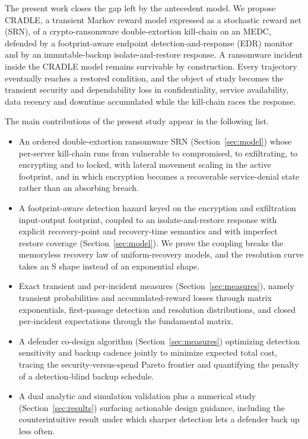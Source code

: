 \documentclass[journal]{IEEEtran}
\begin{document}
The present work closes the gap left by the antecedent model. We propose CRADLE,
a transient Markov reward model expressed as a stochastic reward net (SRN), of a
crypto-ransomware double-extortion kill-chain on an MEDC, defended by a
footprint-aware endpoint detection-and-response (EDR) monitor and by an
immutable-backup isolate-and-restore response. A ransomware incident inside the
CRADLE model remains survivable by construction. Every trajectory eventually
reaches a restored condition, and the object of study becomes the transient
security and dependability loss in confidentiality, service availability, data
recency and downtime accumulated while the kill-chain races the response.

The main contributions of the present study appear in the following list.
\begin{itemize}
\item An ordered double-extortion ransomware SRN (Section~\ref{sec:model}) whose
per-server kill-chain runs from vulnerable to compromised, to exfiltrating, to
encrypting and to locked, with lateral movement scaling in the active footprint,
and in which encryption becomes a recoverable service-denial state rather than
an absorbing breach.
\item A footprint-aware detection hazard keyed on the encryption and
exfiltration input-output footprint, coupled to an isolate-and-restore response
with explicit recovery-point and recovery-time semantics and with imperfect
restore coverage (Section~\ref{sec:model}). We prove the coupling breaks the
memoryless recovery law of uniform-recovery models, and the resolution curve
takes an S shape instead of an exponential shape.
\item Exact transient and per-incident measures (Section~\ref{sec:measures}),
namely transient probabilities and accumulated-reward losses through matrix
exponentials, first-passage detection and resolution distributions, and closed
per-incident expectations through the fundamental matrix.
\item A defender co-design algorithm (Section~\ref{sec:measures}) optimizing
detection sensitivity and backup cadence jointly to minimize expected total
cost, tracing the security-versus-spend Pareto frontier and quantifying the
penalty of a detection-blind backup schedule.
\item A dual analytic and simulation validation plus a numerical study
(Section~\ref{sec:results}) surfacing actionable design guidance, including the
counterintuitive result under which sharper detection lets a defender back up
less often.
\end{itemize}
\end{document}
